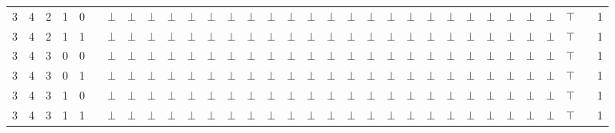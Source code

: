 \documentclass[12pt]{extarticle}
\begin{document}
\begin{landscape}
\begin{tiny}
\begin{longtable}[c]{llllllllllllllllllllllllllllllll}
3 & 4 & 2 & 1 & 0 &  & $\bot$ & $\bot$ & $\bot$ & $\bot$ & $\bot$ & $\bot$ & $\bot$ & $\bot$ & $\bot$ & $\bot$ & $\bot$ & $\bot$ & $\bot$ & $\bot$ & $\bot$ & $\bot$ & $\bot$ & $\bot$ & $\bot$ & $\bot$ & $\bot$ & $\bot$ & $\bot$ & $\top$ &  & 1 \\
3 & 4 & 2 & 1 & 1 &  & $\bot$ & $\bot$ & $\bot$ & $\bot$ & $\bot$ & $\bot$ & $\bot$ & $\bot$ & $\bot$ & $\bot$ & $\bot$ & $\bot$ & $\bot$ & $\bot$ & $\bot$ & $\bot$ & $\bot$ & $\bot$ & $\bot$ & $\bot$ & $\bot$ & $\bot$ & $\bot$ & $\top$ &  & 1 \\
3 & 4 & 3 & 0 & 0 &  & $\bot$ & $\bot$ & $\bot$ & $\bot$ & $\bot$ & $\bot$ & $\bot$ & $\bot$ & $\bot$ & $\bot$ & $\bot$ & $\bot$ & $\bot$ & $\bot$ & $\bot$ & $\bot$ & $\bot$ & $\bot$ & $\bot$ & $\bot$ & $\bot$ & $\bot$ & $\bot$ & $\top$ &  & 1 \\
3 & 4 & 3 & 0 & 1 &  & $\bot$ & $\bot$ & $\bot$ & $\bot$ & $\bot$ & $\bot$ & $\bot$ & $\bot$ & $\bot$ & $\bot$ & $\bot$ & $\bot$ & $\bot$ & $\bot$ & $\bot$ & $\bot$ & $\bot$ & $\bot$ & $\bot$ & $\bot$ & $\bot$ & $\bot$ & $\bot$ & $\top$ &  & 1 \\
3 & 4 & 3 & 1 & 0 &  & $\bot$ & $\bot$ & $\bot$ & $\bot$ & $\bot$ & $\bot$ & $\bot$ & $\bot$ & $\bot$ & $\bot$ & $\bot$ & $\bot$ & $\bot$ & $\bot$ & $\bot$ & $\bot$ & $\bot$ & $\bot$ & $\bot$ & $\bot$ & $\bot$ & $\bot$ & $\bot$ & $\top$ &  & 1 \\
3 & 4 & 3 & 1 & 1 &  & $\bot$ & $\bot$ & $\bot$ & $\bot$ & $\bot$ & $\bot$ & $\bot$ & $\bot$ & $\bot$ & $\bot$ & $\bot$ & $\bot$ & $\bot$ & $\bot$ & $\bot$ & $\bot$ & $\bot$ & $\bot$ & $\bot$ & $\bot$ & $\bot$ & $\bot$ & $\bot$ & $\top$ &  & 1
\label{tab:complete-policy}\\
\end{longtable}
\end{tiny}
\end{landscape}
\end{document}
